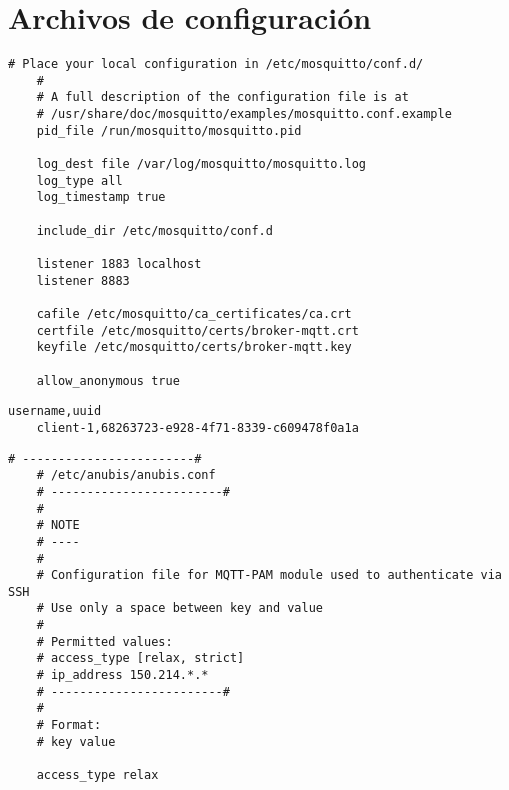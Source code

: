 \addappheadtotoc

\appendix

\chapter{Archivos de configuración}

\begin{lstlisting}[style=Consola, caption={Archivo de configuración PAM}, label={code:pam_conf}]
    # Place your local configuration in /etc/mosquitto/conf.d/
    #
    # A full description of the configuration file is at
    # /usr/share/doc/mosquitto/examples/mosquitto.conf.example
    pid_file /run/mosquitto/mosquitto.pid

    log_dest file /var/log/mosquitto/mosquitto.log
    log_type all
    log_timestamp true

    include_dir /etc/mosquitto/conf.d

    listener 1883 localhost
    listener 8883

    cafile /etc/mosquitto/ca_certificates/ca.crt
    certfile /etc/mosquitto/certs/broker-mqtt.crt
    keyfile /etc/mosquitto/certs/broker-mqtt.key

    allow_anonymous true
\end{lstlisting}

\begin{lstlisting}[style=Consola, caption={Archivo de configuración de usuarios en /etc/anubis/uuid.csv}, label={code:user_conf}]
    username,uuid
    client-1,68263723-e928-4f71-8339-c609478f0a1a   
\end{lstlisting}

\begin{lstlisting}[style=Consola, caption={Archivo de configuración anubis en /etc/anubis/anubis.conf}, label={code:anubis_conf}]
    # ------------------------#
    # /etc/anubis/anubis.conf
    # ------------------------#
    #
    # NOTE
    # ----
    #
    # Configuration file for MQTT-PAM module used to authenticate via SSH
    # Use only a space between key and value
    #
    # Permitted values:
    # access_type [relax, strict]
    # ip_address 150.214.*.*
    # ------------------------#
    #
    # Format:
    # key value

    access_type relax   
\end{lstlisting}

